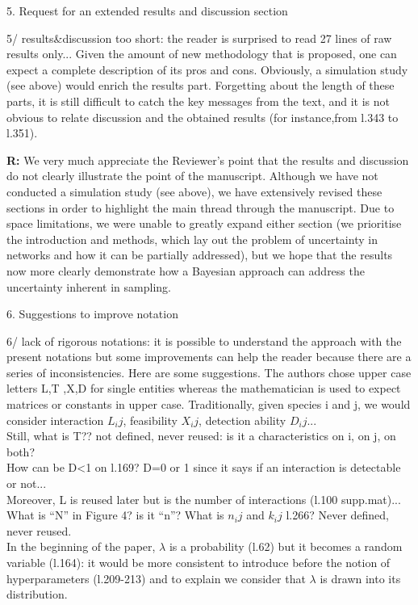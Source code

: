\documentclass[12pt]{letter}
\newenvironment{refquote}{\bigskip \begin{it}}{\end{it}\smallskip}
\begin{document}
	5. Request for an extended results and discussion section


		\begin{refquote}
			5/ results\&discussion too short: the reader is surprised to read 27 lines of raw results only... Given the amount of new methodology that is proposed, one can expect a complete description of its pros and cons. Obviously, a simulation study (see above) would enrich the results part. Forgetting about the length of these parts, it is still difficult to catch the key messages from the text, and it is not obvious to relate discussion and the obtained results (for instance,from l.343 to l.351).
		\end{refquote}


		\textbf{R:} We very much appreciate the Reviewer's point that the results and discussion do not clearly illustrate the point of the manuscript. Although we have not conducted a simulation study (see above), we have extensively revised these sections in order to highlight the main thread through the manuscript. Due to space limitations, we were unable to greatly expand either section (we prioritise the introduction and methods, which lay out the problem of uncertainty in networks and how it can be partially addressed), but we hope that the results now more clearly demonstrate how a Bayesian approach can address the uncertainty inherent in sampling.


	6. Suggestions to improve notation 


		\begin{refquote}
			6/ lack of rigorous notations: it is possible to understand the approach with the present notations but some improvements can help the reader because there are a series of inconsistencies. Here are some suggestions. The authors chose upper case letters L,T ,X,D for single entities whereas the mathematician is used to expect matrices or constants in upper case. Traditionally, given species i and j, we would consider interaction $L_ij$, feasibility $X_ij$, detection ability $D_ij$... \\
			Still, what is T?? not defined, never reused: is it a characteristics on i, on j, on both? \\
			How can be D<1 on l.169? D=0 or 1 since it says if an interaction is detectable or not... \\
			Moreover, L is reused later but is the number of interactions (l.100 supp.mat)... \\
			What is ``N'' in Figure 4? is it ``n''? What is $n_ij$ and $k_ij$ l.266? Never defined, never reused. \\
			In the beginning of the paper, $\lambda$ is a probability (l.62) but it becomes a random variable (l.164): it would be more consistent to introduce before the notion of hyperparameters  (l.209-213) and to explain we consider that $\lambda$ is drawn into its distribution.
		\end{refquote}
\end{document}
